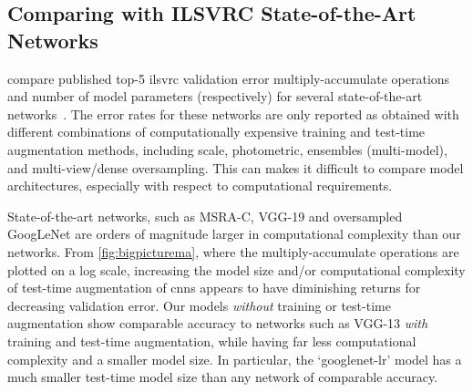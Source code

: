 \documentclass[thesis]{subfiles}
\begin{document}
    \subsection{Comparing with ILSVRC State-of-the-Art Networks}
     compare published top-5 \gls{ilsvrc} validation error \vs multiply-accumulate operations and number of model parameters (respectively) for several state-of-the-art networks~\citep{Simonyan2014verydeep,Szegedy2014going,He2015b}. The error rates for these networks are only reported as obtained with different combinations of computationally expensive training and test-time augmentation methods, including scale, photometric, ensembles (multi-model), and multi-view/dense oversampling. This can makes it difficult to compare model architectures, especially with respect to computational requirements.
    
    State-of-the-art networks, such as MSRA-C, VGG-19 and oversampled GoogLeNet are orders of magnitude larger in computational complexity than our networks. From \cref{fig:bigpicturema}, where the multiply-accumulate operations are plotted on a log scale, increasing the model size and/or computational complexity of test-time augmentation of \glspl{cnn} appears to have diminishing returns for decreasing validation error. Our models \emph{without} training or test-time augmentation show comparable accuracy to networks such as VGG-13 \emph{with} training and test-time augmentation, while having far less computational complexity and a smaller model size. In particular, the `googlenet-lr' model has a much smaller test-time model size than any network of comparable accuracy. 
    
\end{document}
